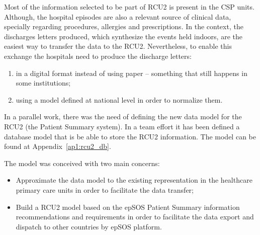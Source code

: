 Most of the information selected to be part of RCU2 is present in the CSP units. Although, the hospital episodes are also a relevant source of clinical data, specially regarding procedures, allergies and prescriptions. In the context, the discharges letters produced, which synthesize the events held indoors, are the easiest way to transfer the data to the RCU2. Nevertheless, to enable this exchange the hospitals need to produce the discharge letters:
\begin{enumerate}
\item in a digital format instead of using paper -- something that still happens in some institutions;
\item using a model defined at national level in order to normalize them.
\end{enumerate}







In a parallel work, there was the need of defining the new data model for the RCU2 (the Patient Summary system). In a team effort it has been defined a database model that is be able to store the RCU2 information. The model can be found at Appendix~\ref{ap1:rcu2_db}.

The model was conceived with two main concerns:
\begin{itemize}
\item Approximate the data model to the existing representation in the healthcare primary care units in order to facilitate the data transfer;
\item Build a RCU2 model based on the epSOS Patient Summary information recommendations and requirements in order to facilitate the data export and dispatch to other countries by epSOS platform.
\end{itemize}

